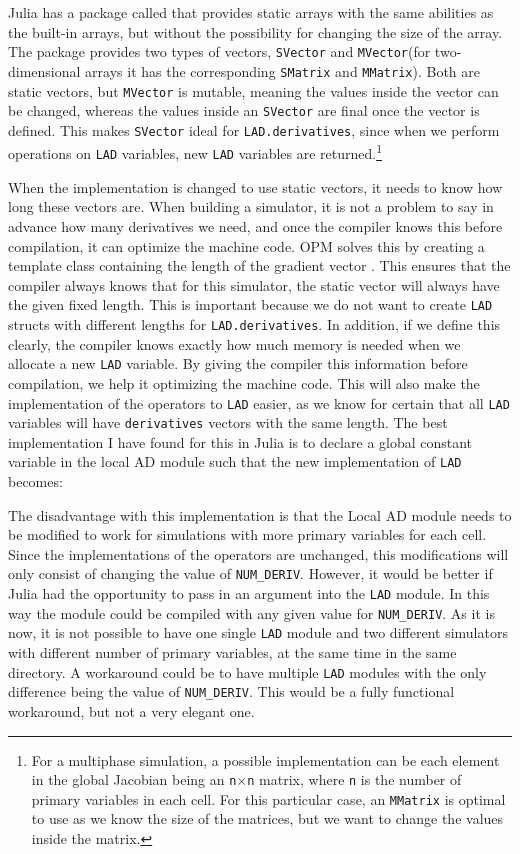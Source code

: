 Julia has a package called \emph{\cite{StaticArrays}} that provides static arrays with the same abilities as the built-in arrays, but without the possibility for changing the size of the array. The package provides two types of vectors, \texttt{SVector} and \texttt{MVector}(for two-dimensional arrays it has the corresponding \texttt{SMatrix} and \texttt{MMatrix}). Both are static vectors, but \texttt{MVector} is mutable, meaning the values inside the vector can be changed, whereas the values inside an \texttt{SVector} are final once the vector is defined. This makes \texttt{SVector} ideal for \texttt{LAD.derivatives}, since when we perform operations on \texttt{LAD} variables, new \texttt{LAD} variables are returned.\footnote{For a multiphase simulation, a possible implementation can be each element in the global Jacobian being an \texttt{n}$\times$\texttt{n} matrix, where \texttt{n} is the number of primary variables in each cell. For this particular case, an \texttt{MMatrix} is optimal to use as we know the size of the matrices, but we want to change the values inside the matrix.} 

When the implementation is changed to use static vectors, it needs to know how long these vectors are. When building a simulator, it is not a problem to say in advance how many derivatives we need, and once the compiler knows this before compilation, it can optimize the machine code. OPM solves this by creating a template class containing the length of the gradient vector \citep{lauser2018local}. This ensures that the compiler always knows that for this simulator, the static vector will always have the given fixed length. This is important because we do not want to create \texttt{LAD} structs with different lengths for \texttt{LAD.derivatives}. In addition, if we define this clearly, the compiler knows exactly how much memory is needed when we allocate a new \texttt{LAD} variable. By giving the compiler this information before compilation, we help it optimizing the machine code. This will also make the implementation of the operators to \texttt{LAD} easier, as we know for certain that all \texttt{LAD} variables will have \texttt{derivatives} vectors with the same length. The best implementation I have found for this in Julia is to declare a global constant variable in the local AD module such that the new implementation of \texttt{LAD} becomes:

The disadvantage with this implementation is that the Local AD module needs to be modified to work for simulations with more primary variables for each cell. Since the implementations of the operators are unchanged, this modifications will only consist of changing the value of \texttt{NUM\_DERIV}. However, it would be better if Julia had the opportunity to pass in an argument into the \texttt{LAD} module. In this way the module could be compiled with any given value for \texttt{NUM\_DERIV}. As it is now, it is not possible to have one single \texttt{LAD} module and two different simulators with different number of primary variables, at the same time in the same directory. A workaround could be to have multiple \texttt{LAD} modules with the only difference being the value of \texttt{NUM\_DERIV}. This would be a fully functional workaround, but not a very elegant one.

